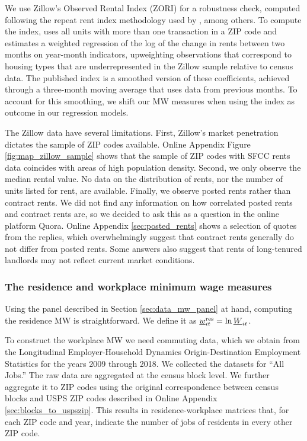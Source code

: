 We use Zillow's Observed Rental Index (ZORI) for a robustness check,
computed following the repeat rent index methodology used by
\textcite{AmbroseEtAl2015}, among others.
To compute the index, \textcite{ZillowZORI} uses all units with more than one 
transaction in a ZIP code and estimates a weighted regression of the 
log of the change in rents between two months on year-month indicators, 
upweighting observations that correspond to housing types that are 
underrepresented in the Zillow sample relative to census data.
The published index is a smoothed version of these coefficients, achieved 
through a three-month moving average that uses data from previous months. 
To account for this smoothing, we shift our MW measures when using the index as 
outcome in our regression models.

The Zillow data have several limitations.
First, Zillow's market penetration dictates the sample of ZIP codes available.
Online Appendix Figure \ref{fig:map_zillow_sample} shows that the sample of ZIP 
codes with SFCC rents data coincides with areas of high population density.
Second, we only observe the median rental value.
No data on the distribution of rents, nor the number of units listed for rent, 
are available.
Finally, we observe posted rents rather than contract rents.
We did not find any information on how correlated posted rents and contract 
rents are, so we decided to ask this as a question in the online platform Quora.
Online Appendix \ref{sec:posted_rents} shows a selection of quotes from the 
replies, which overwhelmingly suggest that contract rents generally do not 
differ from posted rents.
Some answers also suggest that rents of long-tenured landlords may not
reflect current market conditions.

\subsubsection{The residence and workplace minimum wage measures}
\label{sec:data_mw_measures}

Using the panel described in Section \ref{sec:data_mw_panel} at hand, computing 
the residence MW is straightforward.
We define it as $\underline{w}^{\text{res}}_{it} = \ln \underline{W}_{it}$.

To construct the workplace MW we need commuting data, which we obtain from the 
Longitudinal Employer-Household Dynamics Origin-Destination Employment Statistics 
\parencite[LODES;][]{CensusLODES} for the years 2009 through 2018.
We collected the datasets for ``All Jobs.''
The raw data are aggregated at the census block level. 
We further aggregate it to ZIP codes using the original correspondence between 
census blocks and USPS ZIP codes described in Online Appendix 
\ref{sec:blocks_to_uspszip}.
This results in residence-workplace matrices that, for each ZIP code and year, 
indicate the number of jobs of residents in every other ZIP code.

